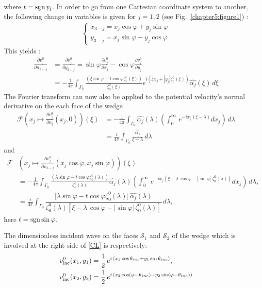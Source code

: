 where $t= \rm sgn \, y_j$. In order to go from one Cartesian coordinate system to another, the following change in variables is given for $j=1,2$ (see Fig.~\ref{chapter5:figure1}) :
\begin{eqnarray}
\label{changecoords}
\left\{
\begin{array}{l}
x_{3-j}=x_j\cos\varphi+y_j\sin\varphi \\
y_{3-j}=x_j\sin\varphi-y_j\cos\varphi
\end{array}
\right.
\end{eqnarray}
This yields :
\begin{align}
\frac{\partial v_j^0}{\partial n_{3-j}}&=\frac{\partial v_j^0}{\partial y_{3-j}}= \sin\varphi \frac{\partial v_j^0}{\partial x_j}-\cos\varphi \frac{\partial v_j^0}{\partial y_j}\\
&=-\frac{1}{4\pi}\int_{\Gamma_0}\frac{(\xi\sin\varphi-t\cos\varphi\zeta_0^0(\xi))}{\zeta_0^0(\xi)}e^{i(\xi x_j+|y_j|\zeta_0^0(\xi))}\hat{\alpha_j}(\xi)\,d\xi
\end{align}
The Fourier transform can now also be applied to the potential velocity's normal derivative on the each face of the wedge
\begin{align}
\mathcal{F}(x_j \mapsto \frac{\partial v_j^0}{\partial n_j} (x_j,0))(\xi)&=-\frac{1}{4\pi} \int_{\Gamma_0}  \hat{\alpha_j}(\lambda)\left( \int_0^{\infty} \, e^{-i x_j (\xi-\lambda)} dx_j \right)\, d \lambda \nonumber\\
&=\frac{i}{4\pi}\int_{\Gamma_0}\frac{\hat{\alpha_j}}{\xi-\lambda}\, d\lambda
\end{align}
and
\begin{align}
\mathcal{F} &\left( x_j \mapsto \frac{\partial v_j^0}{\partial n_{3-j}} ( x_j \cos \varphi,x_j \sin \varphi) \right)(\xi)  \nonumber\\
& =  -\frac{1}{4\pi} \int_{\Gamma_0}  \frac{(\lambda\sin\varphi-t\cos\varphi\zeta_0^0(\lambda))}{\zeta_0^0(\lambda)}\hat{\alpha_j}(\lambda)  \left( \int_0^{\infty} \, e^{-i x_j \left( \xi - \lambda  \, \cos \varphi - |\sin \varphi| \, \zeta_0^0(\lambda) \right)} dx_j \right) \,d \lambda, \nonumber\\
& = \frac{i}{4\pi} \int_{\Gamma_0} \dfrac{ \lbrack \lambda\sin\varphi-t\cos\varphi\zeta_0^0(\lambda)\rbrack \, \hat{\alpha_j}(\lambda)}{\zeta_0^0(\lambda) \left[ \xi - \lambda \, \cos \varphi  - |\sin \varphi| \, \zeta_0^0(\lambda) \right]} \, d\lambda,
\end{align}
here $t=\rm sgn \sin \varphi$.

The dimensionless incident wave on the faces $\mathcal{S}_1$ and $\mathcal{S}_2$ of the wedge which is involved at the right side of \eqref{CL} is respectively:
\begin{subequations}
\label{CL2}
\begin{align}
v^0_{\rm inc}(x_1,y_1) & =  \dfrac{1}{2} \, e^{i \, (x_1 \cos \theta_{inc}+y_1\sin\theta_{inc} ) } ,\\
v^0_{\rm inc}(x_2,y_2) & =   \dfrac{1}{2} \, e^{i \, (x_2 \cos (\varphi - \theta_{inc} )+y_2\sin(\varphi-\theta_{inc}))} 
\end{align}
\end{subequations}

